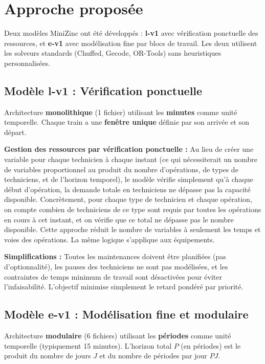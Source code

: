 \section{Approche proposée}
\label{sec:approche}

Deux modèles MiniZinc ont été développés : \textbf{l-v1} avec vérification ponctuelle des ressources, et \textbf{e-v1} avec modélisation fine par blocs de travail. Les deux utilisent les solveurs standards (Chuffed, Gecode, OR-Tools) sans heuristiques personnalisées.

\subsection{Modèle l-v1 : Vérification ponctuelle}

Architecture \textbf{monolithique} (1 fichier) utilisant les \textbf{minutes} comme unité temporelle. Chaque train a une \textbf{fenêtre unique} définie par son arrivée et son départ.

\textbf{Gestion des ressources par vérification ponctuelle :} Au lieu de créer une variable pour chaque technicien à chaque instant (ce qui nécessiterait un nombre de variables proportionnel au produit du nombre d'opérations, de types de techniciens, et de l'horizon temporel), le modèle vérifie simplement qu'à chaque début d'opération, la demande totale en techniciens ne dépasse pas la capacité disponible. Concrètement, pour chaque type de technicien et chaque opération, on compte combien de techniciens de ce type sont requis par toutes les opérations en cours à cet instant, et on vérifie que ce total ne dépasse pas le nombre disponible. Cette approche réduit le nombre de variables à seulement les temps et voies des opérations. La même logique s'applique aux équipements.

\textbf{Simplifications :} Toutes les maintenances doivent être planifiées (pas d'optionnalité), les pauses des techniciens ne sont pas modélisées, et les contraintes de temps minimum de travail sont désactivées pour éviter l'infaisabilité. L'objectif minimise simplement le retard pondéré par priorité.

\subsection{Modèle e-v1 : Modélisation fine et modulaire}

Architecture \textbf{modulaire} (6 fichiers) utilisant les \textbf{périodes} comme unité temporelle (typiquement 15 minutes). L'horizon total $P$ (en périodes) est le produit du nombre de jours $J$ et du nombre de périodes par jour $PJ$.

